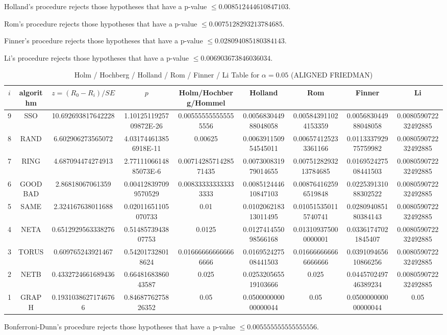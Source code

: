 \documentclass[a4paper,10pt]{article}
\begin{document}
\begin{landscape}
Holland's procedure rejects those hypotheses that have a p-value $\le0.008512444610847103$.


Rom's procedure rejects those hypotheses that have a p-value $\le0.0075128293213784685$.


Finner's procedure rejects those hypotheses that have a p-value $\le0.028094085180384143$.


Li's procedure rejects those hypotheses that have a p-value $\le0.006903673846036034$.



\newpage

\begin{table}[!htp]
\centering\scriptsize
\caption{Holm / Hochberg / Holland / Rom / Finner / Li Table for $\alpha=0.05$ (ALIGNED FRIEDMAN)}
\begin{tabular}{ccccccccc}
$i$&algorithm&$z=(R_0 - R_i)/SE$&$p$&Holm/Hochberg/Hommel&Holland&Rom&Finner&Li\\
\hline
9& SSO&10.692693817642228&1.1012511925709872E-26&0.005555555555555556&0.005683044988048058&0.005843911024153359&0.005683044988048058&0.008059072232492885\\
8& RAND&6.602906273565072&4.031744613856918E-11&0.00625&0.006391150954545011&0.006574125233361166&0.011333792975759982&0.008059072232492885\\
7& RING&4.687094474274913&2.7711106614885073E-6&0.0071428571428571435&0.007300831979014655&0.0075128293213784685&0.016952427508441503&0.008059072232492885\\
6& GOODBAD&2.86818067061359&0.004128397099570529&0.008333333333333333&0.008512444610847103&0.008764162596519848&0.022539131088302522&0.008059072232492885\\
5& SAME&2.324167638011688&0.02011651105070733&0.01&0.010206218313011495&0.010515350115740741&0.028094085180384143&0.008059072232492885\\
4& NETA&0.6512929563338276&0.5148573943807753&0.0125&0.012741455098566168&0.013109375000000001&0.03361747021845407&0.008059072232492885\\
3& TORUS&0.609765243921467&0.542017328018624&0.016666666666666666&0.016952427508441503&0.016666666666666666&0.039109465610866256&0.008059072232492885\\
2& NETB&0.4332724661689436&0.6648168386043587&0.025&0.025320565519103666&0.025&0.044570249746389234&0.008059072232492885\\
1& GRAPH&0.19310386271746766&0.8468776275826352&0.05&0.050000000000000044&0.05&0.050000000000000044&0.05\\
\hline
\end{tabular}
\end{table}
Bonferroni-Dunn's procedure rejects those hypotheses that have a p-value $\le0.005555555555555556$.



\end{landscape}
\end{document}
